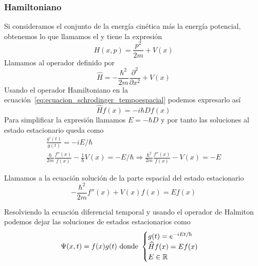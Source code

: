 \subsubsection{Hamiltoniano}
Si consideramos el conjunto de la energía cinética más la energía potencial, obtenemos lo que llamamos el  y tiene la expresión
\begin{equation}
    \label{eq:halmitoniano}
    H(x,p)=\frac{p^2}{2m}+V(x)
\end{equation}
Llamamos  al operador definido por
\begin{equation}
    \label{eq:operador_hamiltoniano}
    \widehat{H}=-\frac{\hbar^2}{2m}\frac{\partial^2}{\partial x^2}+V(x)
\end{equation}
Usando el operador Hamiltoniano en la ecuación~\eqref{eq:ecuacion_schrodinger_tempoespacial} podemos expresarlo así
\begin{equation*}
    \widehat{H}f(x)=-i\hbar Df(x)
\end{equation*}
Para simplificar la expresión llamamos $E=-\hbar D$ y por tanto las soluciones al estado estacionario queda como
\begin{gather*}
    \frac{g'(t)}{g(t)}=-iE/\hbar
    \\
    \frac{\hbar}{2m}\frac{f''(x)}{f(x)}-\frac{1}{\hbar}V(x)=-E/\hbar\Rightarrow \frac{\hbar^2}{2m}\frac{f''(x)}{f(x)}-V(x)=-E
\end{gather*}

\begin{definicion}
    Llamamos  a la ecuación solución de la parte espacial del estado estacionario
    \begin{equation}
        \label{eq:ecuacion_schrodinger_tempoespacial}
        -\frac{\hbar^2}{2m}f''(x)+V(x)f(x)= Ef(x)
    \end{equation}
\end{definicion}

Resolviendo la ecuación diferencial temporal y usando el operador de Halmiton podemos dejar las soluciones de estados estacionarios como
\begin{equation}
    \label{eq:solucion_estado_estacionario}
    \Psi(x,t)=f(x)g(t)\text{ donde }
    \begin{cases}
        g(t)=e^{-iEt/\hbar}\\
        \widehat{H}f(x)=Ef(x)\\
        E\in\R
    \end{cases}
\end{equation}

